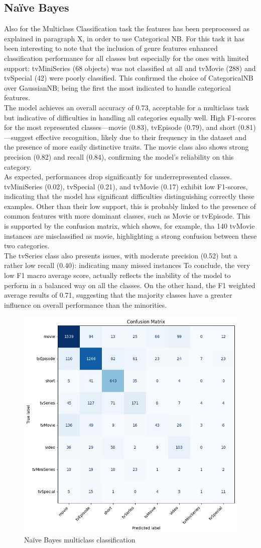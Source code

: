 \subsection{Naïve Bayes}
Also for the Multiclass Classification task the features has been preprocessed as explained in paragraph X, 
in order to use Categorical NB. For this task it has been interesting to note that the inclusion of genre features enhanced classification performance 
for all classes but especially for the ones with limited support: tvMiniSeries (68 objects) was not classified at all and tvMovie (288) and tvSpecial (42) 
were poorly classified. This confirmed the choice of CategoricalNB over GaussianNB; being the first the most indicated to handle categorical features.\\
The model achieves an overall accuracy of 0.73, acceptable for a multiclass task but indicative of difficulties in handling all categories equally well. 
High F1-scores for the most represented classes—movie (0.83), tvEpisode (0.79), and short (0.81)—suggest effective recognition, likely due to their frequency in the dataset and the presence of more easily distinctive traits. The movie class also shows strong precision (0.82) and recall (0.84), 
confirming the model's reliability on this category.\\
As expected, performances drop significantly for underrepresented classes. tvMiniSeries (0.02), tvSpecial (0.21), and tvMovie (0.17) exhibit low F1-scores, indicating that the model has significant difficulties distinguishing correctly these examples. 
Other than their low support, this is probably linked to the presence of common features with more dominant classes, such as Movie or tvEpisode. This is supported by the confusion matrix, which shows, for example, tha 140 tvMovie instances are  misclassified as movie, highlighting a strong confusion between these two categories.\\
The tvSeries class also presents issues, with moderate precision (0.52) but a rather low recall (0.40): indicating many missed instances
To conclude, the very low F1 macro average score, actually reflects the inability of the model to perform in a balanced way on all the classes. 
On the other hand, the F1 weighted average results of 0.71, suggesting that the majority classes have a greater influence on overall performance than the minorities.
\begin{figure}[H]
    \centering
    \includegraphics[width=0.30\linewidth]{plots/nb_multiclass_confmatrix.jpg}
    \captionsetup{justification=centering, width=0.9\linewidth}
    \caption{Naïve Bayes multiclass classification}
    \label{fig:nb_multiclass}
\end{figure}



